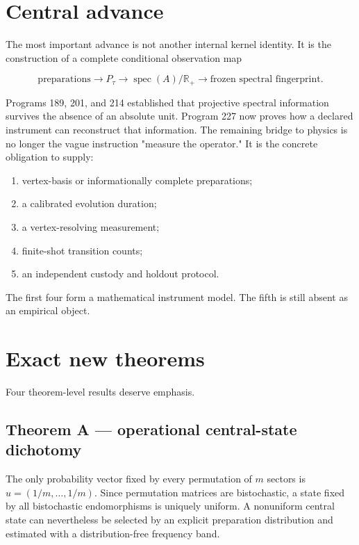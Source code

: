 \documentclass[11pt,a4paper,openany]{report}
\begin{document}
\section{Central advance}

The most important advance is not another internal kernel identity. It is the construction of a complete conditional observation map

\[
\text{preparations}
\longrightarrow
P_\tau
\longrightarrow
\operatorname{spec}(A)/\mathbb R_+
\longrightarrow
\text{frozen spectral fingerprint}.
\]

Programs 189, 201, and 214 established that projective spectral information survives the absence of an absolute unit. Program 227 now proves how a declared instrument can reconstruct that information. The remaining bridge to physics is no longer the vague instruction "measure the operator." It is the concrete obligation to supply:

\begin{enumerate}
\item 
vertex-basis or informationally complete preparations;

\item 
a calibrated evolution duration;

\item 
a vertex-resolving measurement;

\item 
finite-shot transition counts;

\item 
an independent custody and holdout protocol.

\end{enumerate}

The first four form a mathematical instrument model. The fifth is still absent as an empirical object.

\section{Exact new theorems}

Four theorem-level results deserve emphasis.

\subsection{Theorem A --- operational central-state dichotomy}

The only probability vector fixed by every permutation of \(m\) sectors is \(u=(1/m,\ldots,1/m)\). Since permutation matrices are bistochastic, a state fixed by all bistochastic endomorphisms is uniquely uniform. A nonuniform central state can nevertheless be selected by an explicit preparation distribution and estimated with a distribution-free frequency band.
\end{document}
